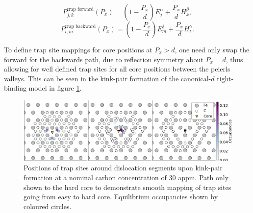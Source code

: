 \documentclass[a4paper,12pt,oneside,print,numbered,index,PageStyleIII]{PhDThesisPSnPDF}
\begin{document}
\begin{appendices}
\[ P^{\text{trap forward}}_{j,k}(P_x) =  \left( 1-\frac{P_x}{d} \right) E_j^{\alpha} +   \frac{P_x}{d}H_k^{\beta},\]
\[ P^{\text{trap backward}}_{l,m}(P_x) =  \left( 1-\frac{P_x}{d} \right) E_m ^{\delta} + \frac{P_x}{d}H_l^{\gamma}.\]

To define trap site mappings for core positions at \(P_x > d\), one need only
swap the forward for the backwards path, due to reflection symmetry about
\(P_x = d\), thus allowing for well defined trap sites for all core positions
between the peierls valleys. This can be seen in the kink-pair formation of
the canonical-\(d\) tight-binding model in figure \ref{fig:kpoccupancies}.

\begin{figure}[htbp]
\centering
\includegraphics[width=1.\textwidth]{iron/Images/mclean_position_movement_occupancy_forward_alternate.png}
\caption{Positions of trap sites around dislocation segments upon kink-pair formation at a nominal carbon concentration of 30 appm. Path only shown to the hard core to demonstrate smooth mapping of trap sites going from easy to hard core. Equilibrium occupancies shown by coloured circles. \label{fig:kpoccupancies}}
\end{figure}


\end{appendices}

\printthesisindex %
\end{document}
